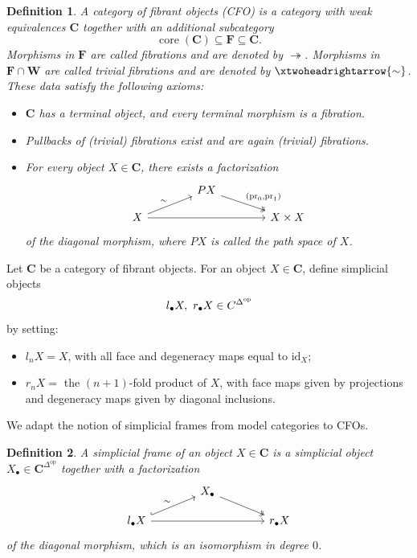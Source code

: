 \documentclass[12pt]{amsart}
\newtheorem{defn}{Definition}[section]
\numberwithin{equation}{section}
\theoremstyle{plain}
\newcommand{\bfC}{\mathbf{C}}
\newcommand{\bfF}{\mathbf{F}}
\newcommand{\bfW}{\mathbf{W}}
\newcommand{\pr}{\mathrm{pr}}
\begin{document}
	\begin{defn}
		A \emph{category of fibrant objects (CFO)} is a category with weak equivalences $\bfC$ together with an additional subcategory
		\[
		\operatorname{core}(\bfC) \subseteq \bfF \subseteq \bfC.
		\]
		Morphisms in $\bfF$ are called \emph{fibrations} and are denoted by $\twoheadrightarrow$. Morphisms in $\bfF \cap \bfW$ are called \emph{trivial fibrations} and are denoted by $\xtwoheadrightarrow{\sim}$. These data satisfy the following axioms:
		\begin{itemize}
			\item $\bfC$ has a terminal object, and every terminal morphism is a fibration.
			
			\item Pullbacks of (trivial) fibrations exist and are again (trivial) fibrations.
			
			\item For every object $X \in \bfC$, there exists a factorization 
			\[
			\begin{tikzcd}[row sep=10pt,column sep=40pt]
				& PX \arrow[dr, two heads, "{(\pr_0,\pr_1)}"] & \\
				X \arrow[ur, "\sim"] \arrow[rr] && X \times X
			\end{tikzcd}
			\]
			of the diagonal morphism, where $PX$ is called the \emph{path space} of $X$.
		\end{itemize}
	\end{defn}
	
	Let $\bfC$ be a category of fibrant objects. For an object $X \in \bfC$, define simplicial objects
	\[
	l_\bullet X,~ r_\bullet X \in \mathcal \bfC^{\Delta^{\mathrm{op}}}
	\]
	by setting:
	\begin{itemize}
		\item $l_n X = X$, with all face and degeneracy maps equal to $\mathrm{id}_X$;
		
		\item $r_n X =$ the $(n+1)$-fold product of $X$, with face maps given by projections and degeneracy maps given by diagonal inclusions.
	\end{itemize}
	We adapt the notion of simplicial frames from model categories to CFOs.
	
	\begin{defn}
		A \emph{simplicial frame} of an object $X \in \bfC$ is a simplicial object $X_\bullet \in \bfC^{\Delta^{\mathrm{op}}}$ together with a factorization 
		\begin{equation}\label{sf}
			\begin{tikzcd}[row sep=10pt,column sep=40pt]
				& X_\bullet \arrow[dr, two heads] & \\
				l_\bullet X  \arrow[ur, hook,"\sim"] \arrow[rr] && r_\bullet X
			\end{tikzcd}
		\end{equation}
		of the diagonal morphism, which is an isomorphism in degree $0$.
	\end{defn}
	
\end{document}

